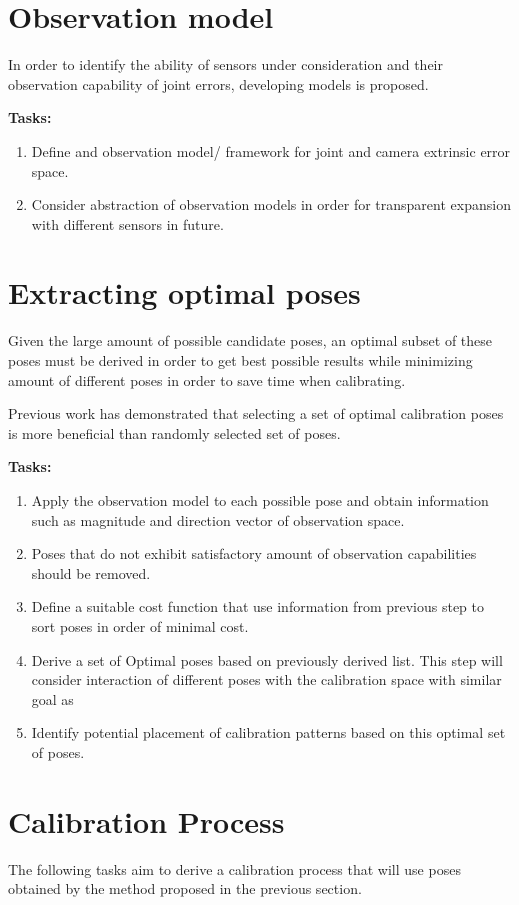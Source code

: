 \documentclass[english, printversion, nomenclature, notitle]{tuvisionthesis} %
\makeatletter
\renewcommand{\todo}[2][]{\tikzexternaldisable\@todo[#1]{#2}\tikzexternalenable}
\makeatother
\begin{document}
\section{Observation model}
In order to identify the ability of sensors under consideration and their observation capability of joint errors, developing  models is proposed.

\textbf{Tasks:}
\begin{enumerate}
	\item Define and observation model/ framework for joint and camera extrinsic error space.
	\item Consider abstraction of observation models in order for transparent expansion with different sensors in future.
\end{enumerate}

\section{Extracting optimal poses}
Given the large amount of possible candidate poses, an optimal subset of these poses must be derived in order to get best possible results while minimizing amount of different poses in order to save time when calibrating.

Previous work has demonstrated that selecting a set of optimal calibration poses is more beneficial than randomly selected set of poses.

\textbf{Tasks:}
\begin{enumerate}
	\item Apply the observation model to each possible pose and obtain information such as magnitude and direction vector of observation space.
	\item Poses that do not exhibit satisfactory amount of observation capabilities should be removed.
	\item Define a suitable cost function that use information from previous step to sort poses in order of minimal cost.
	\item Derive a set of Optimal poses based on previously derived list. This step will consider interaction of different poses with the calibration space with similar goal as  \todo{cite paper about condition number?}
	\item Identify potential placement of calibration patterns based on this optimal set of poses.
\end{enumerate}

\section{Calibration Process}
The following tasks aim to derive a calibration process that will use poses obtained by the method proposed in the previous section.
\end{document}
